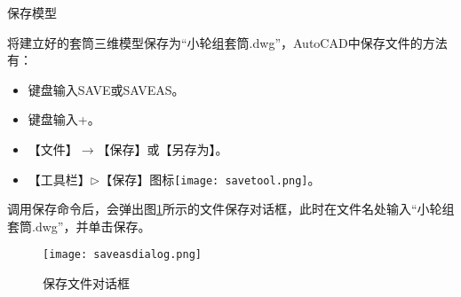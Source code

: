 \begin{procedure}
\item 保存模型

将建立好的套筒三维模型保存为“小轮组套筒.dwg”，AutoCAD中保存文件的方法有：
\begin{itemize}
\item 键盘输入SAVE或SAVEAS。
\item 键盘输入+。
\item 【文件】$\rightarrow$【保存】或【另存为】。
\item 【工具栏】$\triangleright$【保存】图标\texttt{[image: savetool.png]}。
\end{itemize}
调用保存命令后，会弹出图\ref{fig:saveasdialog}所示的文件保存对话框，此时在文件名处输入“小轮组套筒.dwg”，并单击保存。
\begin{figure}[htbp]
\centering
\texttt{[image: saveasdialog.png]}
\caption{保存文件对话框}\label{fig:saveasdialog}
\end{figure}
\end{procedure}

\endinput